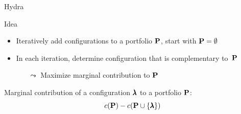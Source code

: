%
\begin{frame}[c]{Hydra~}

\begin{block}{Idea}
\begin{itemize}
\item Iteratively add configurations to a portfolio $\mathbf{P}$, start with $\mathbf{P} = \emptyset$
\item In each iteration, determine configuration that is complementary to~$\mathbf{P}$
\begin{itemize}
\item[$\leadsto$] Maximize marginal contribution to $\mathbf{P}$
\end{itemize}
\end{itemize}

\pause

Marginal contribution of a configuration $\pmb{\lambda}$ to a portfolio $\mathbf{P}$:
\begin{equation}
c(\mathbf{P}) -  c(\mathbf{P} \cup \{\pmb{\lambda}\})  \nonumber
\end{equation}

\end{block}

\pause

\scalebox{0.7}{
		

}

\end{frame}

